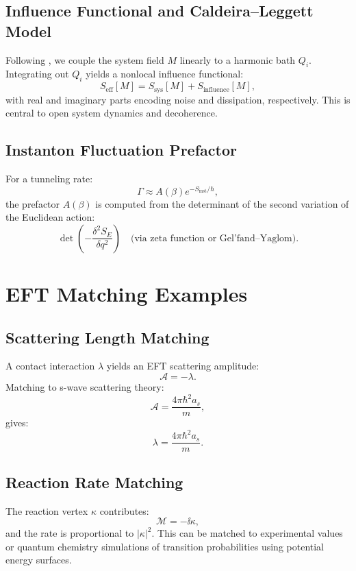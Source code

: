 \subsection{Influence Functional and Caldeira--Leggett Model}
Following \cite{Feynman1963, Caldeira1983}, we couple the system field \( M \) linearly to a harmonic bath \( Q_i \). Integrating out \( Q_i \) yields a nonlocal influence functional:
\[
S_{\text{eff}}[M] = S_{\text{sys}}[M] + S_{\text{influence}}[M],
\]
with real and imaginary parts encoding noise and dissipation, respectively. This is central to open system dynamics and decoherence.

\subsection{Instanton Fluctuation Prefactor}
For a tunneling rate:
\[
\Gamma \approx A(\beta) e^{-S_{\text{inst}}/\hbar},
\]
the prefactor \( A(\beta) \) is computed from the determinant of the second variation of the Euclidean action:
\[
\det\left(-\frac{\delta^2 S_E}{\delta q^2}\right) \quad \text{(via zeta function or Gel'fand--Yaglom)}.
\]

\section{EFT Matching Examples}
\label{app:sec:matching_examples}

\subsection{Scattering Length Matching}
A contact interaction \( \lambda \) yields an EFT scattering amplitude:
\[
\mathcal{A} = -\lambda.
\]
Matching to s-wave scattering theory:
\[
\mathcal{A} = \frac{4\pi\hbar^2 a_s}{m},
\]
gives:
\[
\lambda = \frac{4\pi\hbar^2 a_s}{m}.
\]

\subsection{Reaction Rate Matching}
The reaction vertex \( \kappa \) contributes:
\[
\mathcal{M} = -\ii \kappa,
\]
and the rate is proportional to \( |\kappa|^2 \). This can be matched to experimental values or quantum chemistry simulations of transition probabilities using potential energy surfaces.

